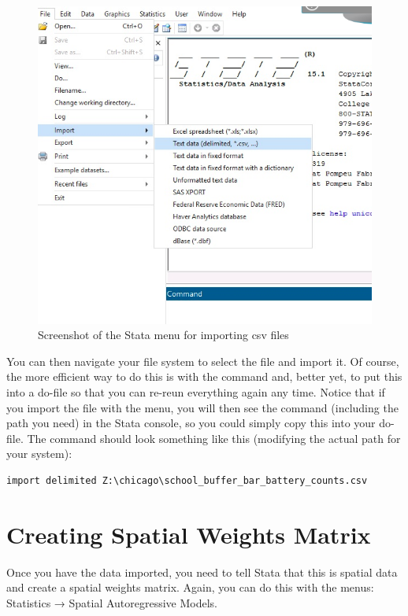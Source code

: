 \documentclass[]{book}
\begin{document}
\begin{figure}
\centering
\includegraphics{images/stata_file_import.png}
\caption{Screenshot of the Stata menu for importing csv files}
\end{figure}

You can then navigate your file system to select the file and import it. Of course, the more efficient way to do this is with the command and, better yet, to put this into a do-file so that you can re-reun everything again any time. Notice that if you import the file with the menu, you will then see the command (including the path you need) in the Stata console, so you could simply copy this into your do-file. The command should look something like this (modifying the actual path for your system):

\begin{verbatim}
import delimited Z:\chicago\school_buffer_bar_battery_counts.csv
\end{verbatim}

\hypertarget{creating-spatial-weights-matrix}{%
\section{Creating Spatial Weights Matrix}\label{creating-spatial-weights-matrix}}

Once you have the data imported, you need to tell Stata that this is spatial data and create a spatial weights matrix. Again, you can do this with the menus: Statistics → Spatial Autoregressive Models.
\end{document}
